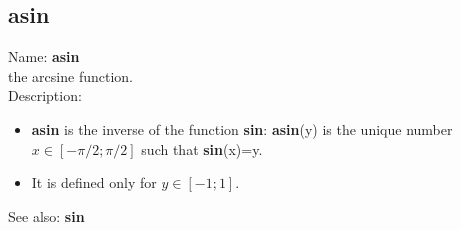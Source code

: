 \subsection{ asin }
\noindent Name: \textbf{asin}\\
the arcsine function.\\

\noindent Description: \begin{itemize}

\item \textbf{asin} is the inverse of the function \textbf{sin}: \textbf{asin}(y) is the unique number 
   $x \in [-\pi/2; \pi/2]$ such that \textbf{sin}(x)=y.

\item It is defined only for $y \in [-1;1]$.
\end{itemize}
See also: \textbf{sin}
